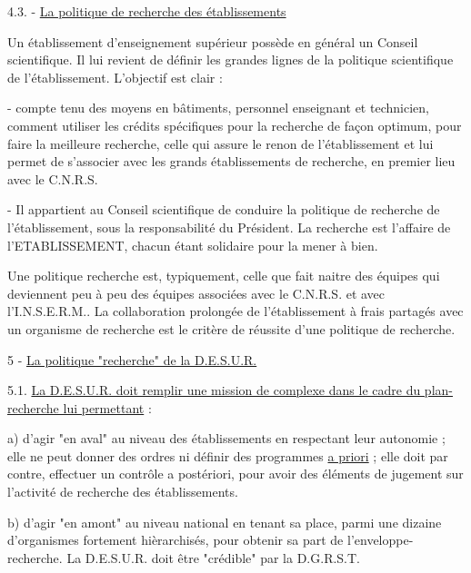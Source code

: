 
4.3. - \uline{La politique de recherche des établissements}

Un établissement d'enseignement supérieur possède en général un Conseil scientifique. Il lui revient de définir les grandes lignes de la politique scientifique de l'établissement. L'objectif est clair :

- compte tenu des moyens en bâtiments, personnel enseignant et technicien, comment utiliser les crédits spécifiques pour la recherche de façon optimum, pour faire la meilleure recherche, celle qui assure le renon de l'établissement et lui permet de s'associer avec les grands établissements de recherche, en premier lieu avec le C.N.R.S.

- Il appartient au Conseil scientifique de conduire la politique de recherche de l'établissement, sous la responsabilité du Président. La recherche est l'affaire de l'ETABLISSEMENT, chacun étant solidaire pour la mener à bien.

Une politique recherche est, typiquement, celle que fait naitre des équipes qui deviennent peu à peu des équipes associées avec le C.N.R.S. et avec l'I.N.S.E.R.M.. La collaboration prolongée de l'établissement à frais partagés avec un organisme de recherche est le critère de réussite d'une politique de recherche.

5 - \uline{La politique "recherche" de la D.E.S.U.R.}

5.1. \uline{La D.E.S.U.R. doit remplir une mission de complexe dans le cadre du plan-recherche lui permettant} :

a) d'agir "en aval" au niveau des établissements en respectant leur autonomie ; elle ne peut donner des ordres ni définir des programmes \uline{a priori} ; elle doit par contre, effectuer un contrôle a postériori, pour avoir des éléments de jugement sur l'activité de recherche des établissements.

b) d'agir "en amont" au niveau national en tenant sa place, parmi une dizaine d'organismes fortement hièrarchisés, pour obtenir sa part de l'enveloppe-recherche. La D.E.S.U.R. doit être "crédible" par la D.G.R.S.T.


